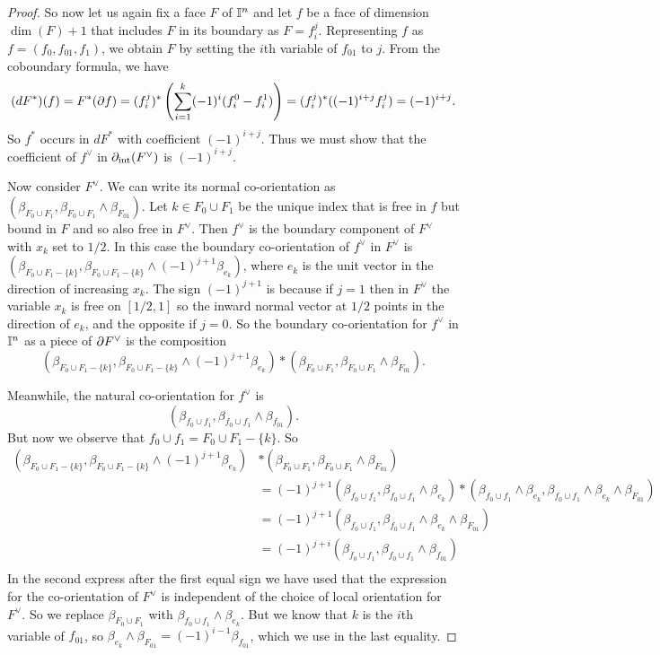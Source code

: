 \begin{proof}
So now let us again fix a face $F$ of $\mathbb{I}^n$ and let $f$ be a face of dimension $\dim(F)+1$ that includes $F$ in its boundary as $F = f_i^j$. Representing $f$ as $f = (f_0,f_{01},f_1)$, we obtain $F$ by setting the $i$th variable of $f_{01}$ to $j$. From the coboundary formula, we have
\begin{equation*}
(dF^*)(f) = F^*(\partial f) = (f_i^j)^*\left(\sum_{i = 1}^k (-1)^i(f_i^0-f^1_i)\right)
 = (f_i^j)^*((-1)^{i+j}f_i^j) = (-1)^{i+j}.
\end{equation*}
So
$f^*$ occurs in $dF^*$ with coefficient $(-1)^{i+j}$. Thus we must show that the coefficient of $f^\vee$ in $\partial_{\text{int}} (F^\vee)$ is $(-1)^{i+j}$.

Now consider $F^\vee$. We can write its normal co-orientation as $(\beta_{F_0 \cup F_1},\beta_{F_0 \cup F_1} \wedge \beta_{F_{01}})$. Let $k \in F_0 \cup F_1$ be the unique index that is free in $f$ but bound in $F$ and so also free in $F^\vee$. Then $f^\vee$ is the boundary component of $F^\vee$ with $x_k$ set to $1/2$. In this case the boundary co-orientation of $f^\vee$ in $F^\vee$ is $(\beta_{F_0 \cup F_1-\{k\}},\beta_{F_0 \cup F_1-\{k\}} \wedge (-1)^{j+1} \beta_{e_k})$, where $e_k$ is the unit vector in the direction of increasing $x_k$. The sign $(-1)^{j+1}$ is because if $j = 1$ then in $F^\vee$ the variable $x_k$ is free on $[1/2,1]$ so the inward normal vector at $1/2$ points in the direction of $e_k$, and the opposite if $j = 0$. So the boundary co-orientation for $f^\vee$ in $\mathbb{I}^n$ as a piece of $\partial F^\vee$ is the composition $$(\beta_{F_0 \cup F_1-\{k\}},\beta_{F_0 \cup F_1-\{k\}} \wedge (-1)^{j+1} \beta_{e_k})*(\beta_{F_0 \cup F_1},\beta_{F_0 \cup F_1} \wedge \beta_{F_{01}}).$$

Meanwhile, the natural co-orientation for $f^\vee$ is $$(\beta_{f_0 \cup f_1},\beta_{f_0 \cup f_1} \wedge \beta_{f_{01}}).$$ But now we observe that $f_0 \cup f_1 = F_0 \cup F_1-\{k\}$. So
\begin{align*}
(\beta_{F_0 \cup F_1-\{k\}},\beta_{F_0 \cup F_1-\{k\}} \wedge (-1)^{j+1} \beta_{e_k})&*(\beta_{F_0 \cup F_1},\beta_{F_0 \cup F_1} \wedge \beta_{F_{01}})\\
& = (-1)^{j+1}(\beta_{f_0 \cup f_1},\beta_{f_0 \cup f_1} \wedge \beta_{e_k})*(\beta_{f_0 \cup f_1} \wedge \beta_{e_k},\beta_{f_0 \cup f_1} \wedge \beta_{e_k} \wedge \beta_{F_{01}})\\
& = (-1)^{j+1}(\beta_{f_0 \cup f_1},\beta_{f_0 \cup f_1} \wedge \beta_{e_k} \wedge \beta_{F_{01}})\\
& = (-1)^{j+i}(\beta_{f_0 \cup f_1},\beta_{f_0 \cup f_1} \wedge \beta_{f_{01}})\\
\end{align*}
In the second express after the first equal sign we have used that the expression for the co-orientation of $F^\vee$ is independent of the choice of local orientation for $F^\vee$. So we replace $\beta_{F_0 \cup F_1}$ with $\beta_{f_0 \cup f_1} \wedge \beta_{e_k}$. But we know that $k$ is the $i$th variable of $f_{01}$, so
$\beta_{e_k} \wedge \beta_{F_{01}} = (-1)^{i-1}\beta_{f_{01}}$, which we use in the last equality.
\end{proof}

